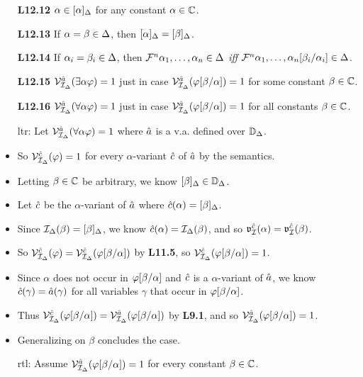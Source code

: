 \documentclass[a4paper, 11pt]{article} %
\begin{document}
\begin{itemize}
  \item[\bf L12.12] $\alpha\in[\alpha]_{\Delta}$ for any constant $\alpha\in\mathbb{C}$.
  \item[\bf L12.13] If $\alpha=\beta\in\Delta$, then $[\alpha]_{\Delta}=[\beta]_{\Delta}$.
  \item[\bf L12.14] If $\alpha_i=\beta_i\in\Delta$, then $\mathcal{F}^n\alpha_1,\ldots,\alpha_n\in\Delta$ \textit{iff} $\mathcal{F}^n\alpha_1,\ldots,\alpha_n[\beta_i/\alpha_i]\in\Delta$.
  \item[\bf L12.15] $\mathcal{V}_{\mathcal{I}_{\Delta}}^{\hat{a}}(\exists \alpha\varphi)=1$ just in case $\mathcal{V}_{\mathcal{I}_{\Delta}}^{\hat{a}}(\varphi[\beta/\alpha])=1$ for some constant $\beta\in\mathbb{C}$.
  \item[\bf L12.16] $\mathcal{V}_{\mathcal{I}_{\Delta}}^{\hat{a}}(\forall \alpha\varphi)=1$ just in case $\mathcal{V}_{\mathcal{I}_{\Delta}}^{\hat{a}}(\varphi[\beta/\alpha])=1$ for all constants $\beta\in\mathbb{C}$.
  \item[\sc ltr:] Let $\mathcal{V}_{\mathcal{I}_{\Delta}}^{\hat{a}}(\forall \alpha\varphi)=1$ where $\hat{a}$ is a v.a. defined over $\mathbb{D}_{\Delta}$.
    \item So $\mathcal{V}_{\mathcal{I}_{\Delta}}^{\hat{c}}(\varphi)=1$ for every $\alpha$-variant $\hat{c}$ of $\hat{a}$ by the semantics.
    \item Letting $\beta\in\mathbb{C}$ be arbitrary, we know $[\beta]_{\Delta}\in\mathbb{D}_{\Delta}$.
    \item Let $\hat{c}$ be the $\alpha$-variant of $\hat{a}$ where $\hat{c}(\alpha)=[\beta]_{\Delta}$.
    \item Since $\mathcal{I}_{\Delta}(\beta)=[\beta]_{\Delta}$, we know $\hat{c}(\alpha)=\mathcal{I}_{\Delta}(\beta)$, and so $\mathfrak{v}_{\mathcal{I}}^{\hat{c}}(\alpha)=\mathfrak{v}_{\mathcal{I}}^{\hat{c}}(\beta)$.
    \item So $\mathcal{V}_{\mathcal{I}_{\Delta}}^{\hat{c}}(\varphi)=\mathcal{V}_{\mathcal{I}_{\Delta}}^{\hat{c}}(\varphi[\beta/\alpha])$ by \textbf{L11.5}, so $\mathcal{V}_{\mathcal{I}_{\Delta}}^{\hat{c}}(\varphi[\beta/\alpha])=1$.
    \item Since $\alpha$ does not occur in $\varphi[\beta/\alpha]$ and $\hat{c}$ is a $\alpha$-variant of $\hat{a}$, we know $\hat{c}(\gamma) = \hat{a}(\gamma)$ for all variables $\gamma$ that occur in $\varphi[\beta/\alpha]$.
    \item Thus $\mathcal{V}_{\mathcal{I}_{\Delta}}^{\hat{c}}(\varphi[\beta/\alpha]) = \mathcal{V}_{\mathcal{I}_{\Delta}}^{\hat{a}}(\varphi[\beta/\alpha])$ by \textbf{L9.1}, and so $\mathcal{V}_{\mathcal{I}_{\Delta}}^{\hat{a}}(\varphi[\beta/\alpha]) = 1$.
    \item Generalizing on $\beta$ concludes the case. 
  \item[\sc rtl:] Assume $\mathcal{V}_{\mathcal{I}_{\Delta}}^{\hat{a}}(\varphi[\beta/\alpha])=1$ for every constant $\beta\in\mathbb{C}$.

\end{itemize}
\end{document}
